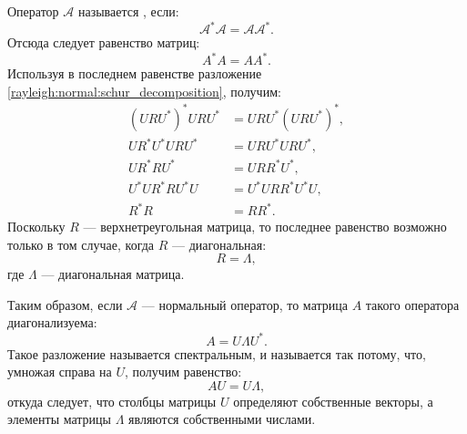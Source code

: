 Оператор $\mathcal{A}$ называется , если:
\[
    \mathcal{A}^* \mathcal{A} = \mathcal{A} \mathcal{A}^* .
\]
Отсюда следует равенство матриц:
\[
    A^* A = A A^* .
\]
Используя в последнем равенстве разложение \eqref{rayleigh:normal:schur_decomposition}, получим:
\begin{align*}
    \left ( U R U^* \right ) ^* U R U^* & = U R U^* \left ( U R U^* \right )^* , \\
    U R^* U^* U R U^* & = U R U^* U R U^* , \\
    U R^* R U^* & = U R R^* U^* , \\
    U^* U R^* R U^* U & = U^* U R R^* U^* U, \\
    R^* R & = R R^* .
\end{align*}
Поскольку $R$ --- верхнетреугольная матрица, то последнее равенство возможно только в том случае, когда $R$ --- диагональная:
\[
    R = \Lambda,
\]
где $\Lambda$ --- диагональная матрица.

Таким образом, если $\mathcal{A}$ --- нормальный оператор, то матрица $A$ такого оператора диагонализуема:
\begin{equation}
    \label{rayleigh:normal:spectral_decomposition}
    A = U \Lambda U^* .
\end{equation}
Такое разложение называется спектральным, и называется так потому, что, умножая справа на $U$, получим равенство:
\[
    A U = U \Lambda,
\]
откуда следует, что столбцы матрицы $U$ определяют собственные векторы, а элементы матрицы $\Lambda$ являются собственными числами.

